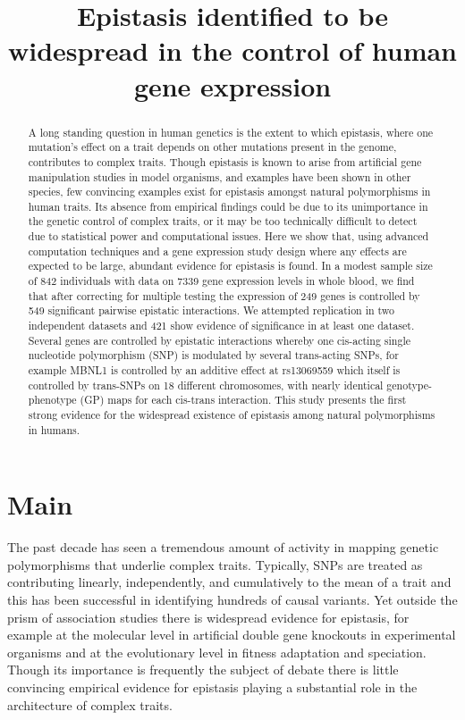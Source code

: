 \documentclass{article}
\title{Epistasis identified to be widespread in the control of human gene expression}
\begin{document}
\maketitle


\begin{abstract}
A long standing question in human genetics is the extent to which epistasis, where one mutation's effect on a trait depends on other mutations present in the genome, contributes to complex traits. Though epistasis is known to arise from artificial gene manipulation studies in model organisms, and examples have been shown in other species, few convincing examples exist for epistasis amongst natural polymorphisms in human traits. Its absence from empirical findings could be due to its unimportance in the genetic control of complex traits, or it may be too technically difficult to detect due to statistical power and computational issues. Here we show that, using advanced computation techniques and a gene expression study design where any effects are expected to be large, abundant evidence for epistasis is found. In a modest sample size of 842 individuals with data on 7339 gene expression levels in whole blood, we find that after correcting for multiple testing the expression of 249 genes is controlled by 549 significant pairwise epistatic interactions. We attempted replication in two independent datasets and 421 show evidence of significance in at least one dataset. Several genes are controlled by epistatic interactions whereby one cis-acting single nucleotide polymorphism (SNP) is modulated by several trans-acting SNPs, for example MBNL1 is controlled by an additive effect at rs13069559 which itself is controlled by trans-SNPs on 18 different chromosomes, with nearly identical genotype-phenotype (GP) maps for each cis-trans interaction. This study presents the first strong evidence for the widespread existence of epistasis among natural polymorphisms in humans.
\end{abstract}


\section{Main}

The past decade has seen a tremendous amount of activity in mapping genetic polymorphisms that underlie complex traits. Typically, SNPs are treated as contributing linearly, independently, and cumulatively to the mean of a trait and this has been successful in identifying hundreds of causal variants. Yet outside the prism of association studies there is widespread evidence for epistasis, for example at the molecular level in artificial double gene knockouts in experimental organisms and at the evolutionary level in fitness adaptation and speciation. Though its importance is frequently the subject of debate there is little convincing empirical evidence for epistasis playing a substantial role in the architecture of complex traits.
\end{document}
